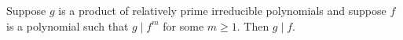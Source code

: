 Suppose $g$ is a product of relatively prime irreducible polynomials and suppose $f$ is a polynomial such that $g \mid f^m$ for some $m \geq 1$. Then $g \mid f$.
